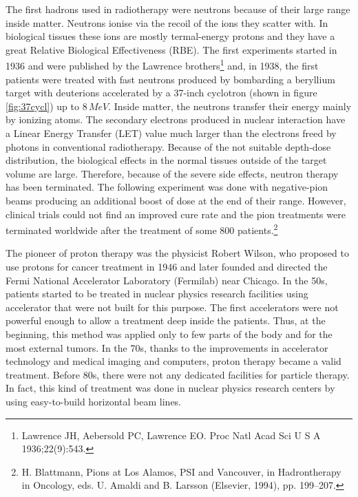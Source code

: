 \documentclass[12pt, a4paper, twoside]{book}
\begin{document}
The first hadrons used in radiotherapy were neutrons because of their large range inside matter. Neutrons ionise via the recoil of the ions they scatter with. In biological tissues these ions are mostly termal-energy protons and they have a great Relative Biological Effectiveness (RBE). 
The first experiments started in 1936 and were published by the Lawrence brothers\footnote{Lawrence JH, Aebersold PC, Lawrence EO. Proc Natl Acad Sci U S A 1936;22(9):543.} and, in 1938, the first patients were treated with fast neutrons produced by bombarding a beryllium target with deuterions accelerated by a 37-inch cyclotron (shown in figure \ref{fig:37cycl}) up to $8\,MeV$. Inside matter, the neutrons transfer their energy mainly by ionizing atoms. The secondary electrons produced in nuclear interaction have a Linear Energy Transfer (LET) value much larger than the electrons freed by photons in conventional radiotherapy.
Because of the not suitable depth-dose distribution, the biological effects in the normal tissues outside of the target volume are large. Therefore, because of the severe side effects, neutron therapy has been terminated.
The following experiment was done with negative-pion beams producing an additional boost of dose at the end of their range. However, clinical trials could not find an improved cure rate and the pion treatments were terminated worldwide after the treatment of some 800 patients.\footnote{H. Blattmann, Pions at Los Alamos, PSI and Vancouver, in Hadrontherapy in Oncology, eds. U. Amaldi and B. Larsson (Elsevier, 1994), pp. 199–207.}

The pioneer of proton therapy was the physicist Robert Wilson, who proposed to use protons for cancer treatment in 1946 and later founded and directed the Fermi National Accelerator Laboratory (Fermilab) near Chicago.
In the 50s, patients started to be treated in nuclear physics research facilities using accelerator that were not built for this purpose.
The first accelerators were not powerful enough to allow a treatment deep inside the patients. Thus, at the beginning, this method was applied only to few parts of the body and for the most external tumors.
In the 70s, thanks to the improvements in accelerator technology and medical imaging and computers, proton therapy became a valid treatment.
Before 80s, there were not any dedicated facilities for particle therapy. In fact, this kind of treatment was done in nuclear physics research centers by using easy-to-build horizontal beam lines.
\end{document}
